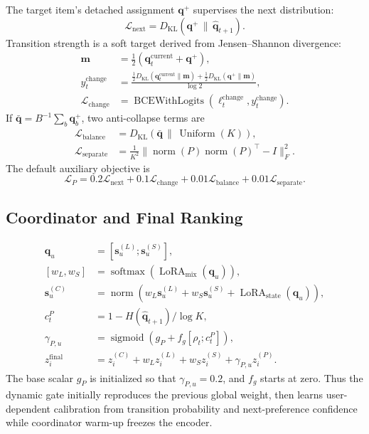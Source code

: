 \documentclass[11pt,a4paper]{article}
\newcommand{\softmax}{\operatorname{softmax}}
\newcommand{\sigmoid}{\operatorname{sigmoid}}
\begin{document}
The target item's detached assignment $\bm q^+$ supervises the next
distribution:
\begin{equation}
  \mathcal L_{\mathrm{next}}
  =D_{\mathrm{KL}}(\bm q^+\,\|\,\widehat{\bm q}_{t+1}).
\end{equation}
Transition strength is a soft target derived from Jensen--Shannon divergence:
\begin{align}
  \bm m&=\tfrac12(\bm q_t^{\mathrm{current}}+\bm q^+),\\
  y_t^{\mathrm{change}}
  &=\frac{
    \tfrac12D_{\mathrm{KL}}(\bm q_t^{\mathrm{current}}\|\bm m)
    +\tfrac12D_{\mathrm{KL}}(\bm q^+\|\bm m)}
    {\log 2},\\
  \mathcal L_{\mathrm{change}}
  &=\operatorname{BCEWithLogits}
    (\ell_t^{\mathrm{change}},y_t^{\mathrm{change}}).
\end{align}
If $\bar{\bm q}=B^{-1}\sum_b\bm q_b^+$, two anti-collapse terms are
\begin{align}
  \mathcal L_{\mathrm{balance}}
    &=D_{\mathrm{KL}}(\bar{\bm q}\,\|\,\operatorname{Uniform}(K)),\\
  \mathcal L_{\mathrm{separate}}
    &=\frac1{K^2}\|
      \operatorname{norm}(P)\operatorname{norm}(P)^\top-I
    \|_F^2.
\end{align}
The default auxiliary objective is
\begin{equation}
  \mathcal L_P
  =0.2\mathcal L_{\mathrm{next}}
  +0.1\mathcal L_{\mathrm{change}}
  +0.01\mathcal L_{\mathrm{balance}}
  +0.01\mathcal L_{\mathrm{separate}}.
\end{equation}

\subsection{Coordinator and Final Ranking}

\begin{align}
  \bm q_u&=[\bm s_u^{(L)};\bm s_u^{(S)}],\\
  [w_L,w_S]&=\softmax(\operatorname{LoRA}_{\mathrm{mix}}(\bm q_u)),\\
  \bm s_u^{(C)}
  &=
  \operatorname{norm}\left(
  w_L\bm s_u^{(L)}+w_S\bm s_u^{(S)}
  +\operatorname{LoRA}_{\mathrm{state}}(\bm q_u)\right),\\
  c_t^P&=1-H(\widehat{\bm q}_{t+1})/\log K,\\
  \gamma_{P,u}&=\sigmoid(g_P+f_g[\rho_t;c_t^P]),\\
  z_i^{\mathrm{final}}
  &=z_i^{(C)}+w_Lz_i^{(L)}+w_Sz_i^{(S)}
    +\gamma_{P,u}z_i^{(P)}.
\end{align}
The base scalar $g_P$ is initialized so that $\gamma_{P,u}=0.2$, and $f_g$
starts at zero. Thus the dynamic gate initially reproduces the previous global
weight, then learns user-dependent calibration from transition probability and
next-preference confidence while coordinator warm-up freezes the encoder.
\end{document}

